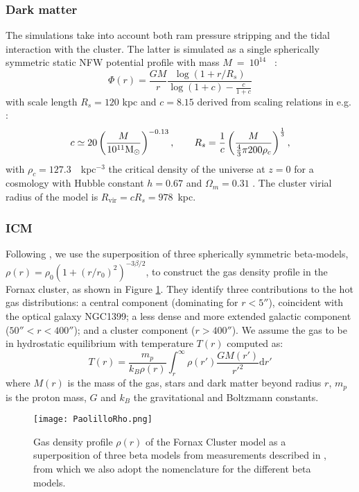 \subsubsection{Dark matter}
The simulations take into account both ram pressure stripping and the tidal interaction with the cluster.
The latter is simulated as a single spherically symmetric static NFW potential profile \citep{Navarro1996} with mass $M~=~10^{14}$~\Msun{} \citep{Drinkwater2001a}:
\begin{equation}
    \Phi(r) = \frac{G M}{r} \frac{\log(1+r/R_s)}{\log(1 + c) - \frac{c}{1+c}}
\end{equation}
with scale length $R_s = 120$ kpc and $c=8.15$ derived from scaling relations in e.g. \citet{Gentile2004, Wechsler2002}:
\begin{equation}
    c \simeq 20 \left(\frac{M}{10^{11} \text{\text{M}$_{\odot}${}} }\right)^{-0.13}, \qquad
    R_s = \frac 1 c \left(\frac{M}{\frac 4 3 \pi 200 \rho_c}\right)^\frac 1 3,
\end{equation}
with $\rho_c = 127.3$~\Msun{}~kpc$^{-3}$ the critical density of the universe at $z=0$ for a cosmology with Hubble constant $h=0.67$ and $\Omega_m = 0.31$ \citep{Planck2015}.
The cluster virial radius of the model is $R_{\mathrm{vir}} = c R_s = 978$~kpc.

\subsubsection{ICM} \label{sec:ICM}
Following \citet{Paolillo2002}, we use the superposition of three spherically symmetric beta-models, $\rho(r) = \rho_0 (1 + (r/r_0)^2 )^{-3\beta/2}$, to construct the gas density profile in the Fornax cluster, as shown in Figure \ref{fig:profiles}.
They identify three contributions to the hot gas distributions: a central component (dominating for $r<5''$), coincident with the optical galaxy NGC1399; a less dense and more extended galactic component ($50''<r<400''$); and a cluster component ($r>400''$).
We assume the gas to be in hydrostatic equilibrium with temperature $T(r)$ computed as:
\begin{equation}
   T(r) = \frac {m_p}{k_B \rho(r)} \int_r^\infty \rho(r') \frac{GM(r')}{r'^2} \mathrm{d} r'
\end{equation}
where $M(r)$ is the mass of the gas, stars and dark matter beyond radius $r$, $m_p$ is the proton mass, $G$ and $k_B$ the gravitational and Boltzmann constants.

\begin{figure}
\centering
\texttt{[image: PaolilloRho.png]}
\caption{Gas density profile $\rho(r)$ of the  Fornax Cluster model as a superposition of three beta models from measurements described in \citet{Paolillo2002}, from which we also adopt the nomenclature for the different beta models.
}
\label{fig:profiles}
\end{figure}

